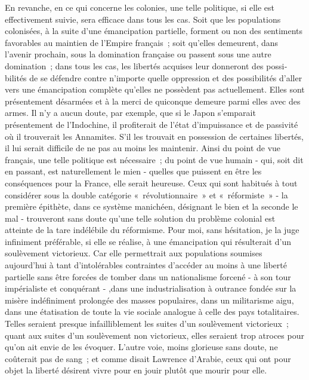 \documentclass[french,twoside]{book} %
\begin{document}
En revanche, en ce qui concerne les colonies, une telle politique, si elle est effectivement suivie, sera efficace dans tous les cas. Soit que les populations colonisées, à la suite d'une émancipation partielle, forment ou non des senti­ments favorables au maintien de l'Empire français ; soit qu'elles demeurent, dans l'avenir prochain, sous la domination française ou passent sous une autre domination ; dans tous les cas, les libertés acquises leur donneront des possi­bilités de se défendre contre n'importe quelle oppression et des possibilités d'aller vers une émancipation complète qu'elles ne possèdent pas actuellement. Elles sont présentement désarmées et à la merci de quiconque demeure parmi elles avec des armes. Il n'y a aucun doute, par exemple, que si le Japon s'emparait présentement de l'Indochine, il profiterait de l'état d'impuissance et de passivité où il trouverait les Annamites. S'il les trouvait en possession de certaines libertés, il lui serait difficile de ne pas au moins les maintenir. Ainsi du point de vue français, une telle politique est nécessaire ; du point de vue humain - qui, soit dit en passant, est naturellement le mien - quelles que puissent en être les conséquences pour la France, elle serait heureuse. Ceux qui sont habitués à tout considérer sous la double catégorie « révolutionnaire » et « réformiste » - la première épithète, dans ce système manichéen, désignant le bien et la seconde le mal - trouveront sans doute qu'une telle solution du problème colonial est atteinte de la tare indélébile du réformisme. Pour moi, sans hésitation, je la juge infiniment préférable, si elle se réalise, à une éman­cipation qui résulterait d'un soulèvement victorieux. Car elle permettrait aux populations soumises aujourd'hui à tant d'intolérables contraintes d'accéder au moins à une liberté partielle sans être forcées de tomber dans un nationalisme forcené - à son tour impérialiste et conquérant - ,dans une industrialisation à outrance fondée sur la misère indéfiniment prolongée des masses populaires, dans un militarisme aigu, dans une étatisation de toute la vie sociale analogue à celle des pays totalitaires. Telles seraient presque infailliblement les suites d'un soulèvement victorieux ; quant aux suites d'un soulèvement non victo­rieux, elles seraient trop atroces pour qu'on ait envie de les évoquer. L'autre voie, moins glorieuse sans doute, ne coûterait pas de sang ; et comme disait Lawrence d'Arabie, ceux qui ont pour objet la liberté désirent vivre pour en jouir plutôt que mourir pour elle.\par
\end{document}

